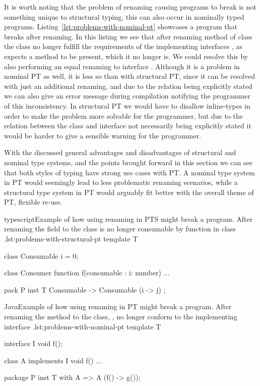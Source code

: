 It is worth noting that the problem of renaming causing programs to break is not something unique to structural typing, this can also occur in nominally typed programs.
Listing~\vref{lst:problems-with-nominal-pt} showcases a program that breaks after renaming.
In this listing we see that after renaming method  of class  the class no longer fulfill the requirements of the implementing interfaces , as  expects a method  to be present, which it no longer is.
We could resolve this by also performing an equal renaming to interface .
Although it is a problem in nominal PT as well, it is less so than with structural PT, since it can be resolved with just an additional renaming, and due to the relation being explicitly stated we can also give an error message during compilation notifying the programmer of this inconsistency.
In structural PT we would have to disallow inline-types in order to make the problem more solvable for the programmer, but due to the relation between the class and interface not necessarily being explicitly stated it would be harder to give a sensible warning for the programmer.

With the discussed general advantages and disadvantages of structural and nominal type systems, and the points brought forward in this section we can see that both styles of typing have strong use cases with PT\@.
A nominal type system in PT would seemingly lead to less problematic renaming scenarios, while a structural type system in PT would arguably fit better with the overall theme of PT, flexible re-use.

\begin{code}{typescript}{Example of how using renaming in PTS might break a program. After renaming the field  to  the class  is no longer consumable by function  in class .}{lst:problems-with-structural-pt}
    template T {
        class Consumable {
            i = 0;
        }

        class Consumer {
            function f(consumable : {i: number}) {
                ...
            }
        }
    }

    pack P {
        inst T { Consumable -> Consumable (i -> j) };
    }
\end{code}

\begin{code}{Java}{Example of how using renaming in PT might break a program. After renaming the method  to  the class, , no longer conform to the implementing interface .}{lst:problems-with-nominal-pt}
    template T {
        interface I {
            void f();
        }

        class A implements I {
            void f() { ... }
        }
    }

    package P {
        inst T with A => A (f() -> g());
    }
\end{code}